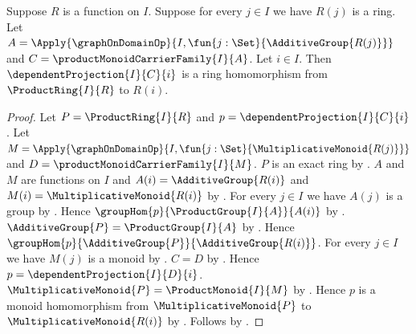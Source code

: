 \begin{theorem}\label{product_ring_projection_hom}
    Suppose $R$ is a function on $I$.
    Suppose for every $j\in I$ we have $R(j)$ is a ring.
    Let
        $A=\Apply{\graphOnDomainOp}{
            I,\fun{j:\Set}{\AdditiveGroup{R(j)}}}$ and
        $C=\productMonoidCarrierFamily{I}{A}$.
    Let $i\in I$.
    Then $\dependentProjection{I}{C}{i}$ is a ring homomorphism from
        $\ProductRing{I}{R}$ to $R(i)$.
\end{theorem}
\begin{proof}
    Let $P=\ProductRing{I}{R}$ and
        $p=\dependentProjection{I}{C}{i}$.
    Let $M=\Apply{\graphOnDomainOp}{
        I,\fun{j:\Set}{\MultiplicativeMonoid{R(j)}}}$ and
        $D=\productMonoidCarrierFamily{I}{M}$.
    $P$ is an exact ring by .
    $A$ and $M$ are functions on $I$ and
        $A(i)=\AdditiveGroup{R(i)}$ and
        $M(i)=\MultiplicativeMonoid{R(i)}$ by
        .
    For every $j\in I$ we have $A(j)$ is a group by
        .
    Hence $\groupHom{p}{\ProductGroup{I}{A}}{A(i)}$ by
        .
    $\AdditiveGroup{P}=\ProductGroup{I}{A}$ by
        .
    Hence $\groupHom{p}{\AdditiveGroup{P}}{\AdditiveGroup{R(i)}}$.
    For every $j\in I$ we have $M(j)$ is a monoid by
        .
    $C=D$ by .
    Hence $p=\dependentProjection{I}{D}{i}$.
    $\MultiplicativeMonoid{P}=\ProductMonoid{I}{M}$ by
        .
    Hence $p$ is a monoid homomorphism from
        $\MultiplicativeMonoid{P}$ to
        $\MultiplicativeMonoid{R(i)}$ by
        .
    Follows by .
\end{proof}

